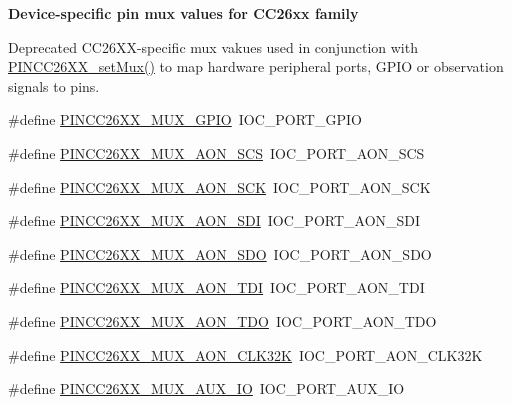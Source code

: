 \begin{Indent}{\bf Device-\/specific pin mux values for C\+C26xx family}
{\begin{DoxyRefDesc}{Deprecated}
C\+C26\+X\+X-\/specific mux vakues used in conjunction with \hyperlink{_p_i_n_c_c26_x_x_8h_ac8cbb649db80dd03d8e8a487aef43294}{P\+I\+N\+C\+C26\+X\+X\+\_\+set\+Mux()} to map hardware peripheral ports, G\+P\+I\+O or observation signals to pins. \end{DoxyRefDesc}
}\begin{DoxyCompactItemize}
\item 
\#define \hyperlink{_p_i_n_c_c26_x_x_8h_afc65e6d65f939680cc596a207713b5c4}{P\+I\+N\+C\+C26\+X\+X\+\_\+\+M\+U\+X\+\_\+\+G\+P\+I\+O}~I\+O\+C\+\_\+\+P\+O\+R\+T\+\_\+\+G\+P\+I\+O
\item 
\#define \hyperlink{_p_i_n_c_c26_x_x_8h_aaec6571cc330fad7cc0f456ce92e54c0}{P\+I\+N\+C\+C26\+X\+X\+\_\+\+M\+U\+X\+\_\+\+A\+O\+N\+\_\+\+S\+C\+S}~I\+O\+C\+\_\+\+P\+O\+R\+T\+\_\+\+A\+O\+N\+\_\+\+S\+C\+S
\item 
\#define \hyperlink{_p_i_n_c_c26_x_x_8h_a4dd135e99cb2ef3c9d6025b927b65d4b}{P\+I\+N\+C\+C26\+X\+X\+\_\+\+M\+U\+X\+\_\+\+A\+O\+N\+\_\+\+S\+C\+K}~I\+O\+C\+\_\+\+P\+O\+R\+T\+\_\+\+A\+O\+N\+\_\+\+S\+C\+K
\item 
\#define \hyperlink{_p_i_n_c_c26_x_x_8h_a9a32e54a0307edd69c4f398ee243e555}{P\+I\+N\+C\+C26\+X\+X\+\_\+\+M\+U\+X\+\_\+\+A\+O\+N\+\_\+\+S\+D\+I}~I\+O\+C\+\_\+\+P\+O\+R\+T\+\_\+\+A\+O\+N\+\_\+\+S\+D\+I
\item 
\#define \hyperlink{_p_i_n_c_c26_x_x_8h_a9a26180801d733cc5141d9d4bfe32fb8}{P\+I\+N\+C\+C26\+X\+X\+\_\+\+M\+U\+X\+\_\+\+A\+O\+N\+\_\+\+S\+D\+O}~I\+O\+C\+\_\+\+P\+O\+R\+T\+\_\+\+A\+O\+N\+\_\+\+S\+D\+O
\item 
\#define \hyperlink{_p_i_n_c_c26_x_x_8h_ad451f024f76688fc7eb41557536db30b}{P\+I\+N\+C\+C26\+X\+X\+\_\+\+M\+U\+X\+\_\+\+A\+O\+N\+\_\+\+T\+D\+I}~I\+O\+C\+\_\+\+P\+O\+R\+T\+\_\+\+A\+O\+N\+\_\+\+T\+D\+I
\item 
\#define \hyperlink{_p_i_n_c_c26_x_x_8h_a431c98678be9df655e80bc7e2386e9dc}{P\+I\+N\+C\+C26\+X\+X\+\_\+\+M\+U\+X\+\_\+\+A\+O\+N\+\_\+\+T\+D\+O}~I\+O\+C\+\_\+\+P\+O\+R\+T\+\_\+\+A\+O\+N\+\_\+\+T\+D\+O
\item 
\#define \hyperlink{_p_i_n_c_c26_x_x_8h_a99871b823a34287bfc2027606551db4d}{P\+I\+N\+C\+C26\+X\+X\+\_\+\+M\+U\+X\+\_\+\+A\+O\+N\+\_\+\+C\+L\+K32\+K}~I\+O\+C\+\_\+\+P\+O\+R\+T\+\_\+\+A\+O\+N\+\_\+\+C\+L\+K32\+K
\item 
\#define \hyperlink{_p_i_n_c_c26_x_x_8h_a7fc71cdd74fbd97d4297ffed39302713}{P\+I\+N\+C\+C26\+X\+X\+\_\+\+M\+U\+X\+\_\+\+A\+U\+X\+\_\+\+I\+O}~I\+O\+C\+\_\+\+P\+O\+R\+T\+\_\+\+A\+U\+X\+\_\+\+I\+O
\item 

\end{DoxyCompactItemize}
\end{Indent}
